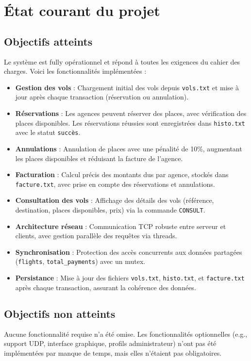 \documentclass[a4paper,12pt]{article}
\begin{document}
\section{État courant du projet}
\subsection{Objectifs atteints}
Le système est fully opérationnel et répond à toutes les exigences du cahier des charges. Voici les fonctionnalités implémentées :
\begin{itemize}
    \item \textbf{Gestion des vols} : Chargement initial des vols depuis \texttt{vols.txt} et mise à jour après chaque transaction (réservation ou annulation).
    \item \textbf{Réservations} : Les agences peuvent réserver des places, avec vérification des places disponibles. Les réservations réussies sont enregistrées dans \texttt{histo.txt} avec le statut \texttt{succès}.
    \item \textbf{Annulations} : Annulation de places avec une pénalité de 10\%, augmentant les places disponibles et réduisant la facture de l’agence.
    \item \textbf{Facturation} : Calcul précis des montants dus par agence, stockés dans \texttt{facture.txt}, avec prise en compte des réservations et annulations.
    \item \textbf{Consultation des vols} : Affichage des détails des vols (référence, destination, places disponibles, prix) via la commande \texttt{CONSULT}.
    \item \textbf{Architecture réseau} : Communication TCP robuste entre serveur et clients, avec gestion parallèle des requêtes via threads.
    \item \textbf{Synchronisation} : Protection des accès concurrents aux données partagées (\texttt{flights}, \texttt{total_payments}) avec un mutex.
    \item \textbf{Persistance} : Mise à jour des fichiers \texttt{vols.txt}, \texttt{histo.txt}, et \texttt{facture.txt} après chaque transaction, assurant la cohérence des données.
\end{itemize}

\subsection{Objectifs non atteints}
Aucune fonctionnalité requise n’a été omise. Les fonctionnalités optionnelles (e.g., support UDP, interface graphique, profils administrateur) n’ont pas été implémentées par manque de temps, mais elles n’étaient pas obligatoires.
\end{document}
